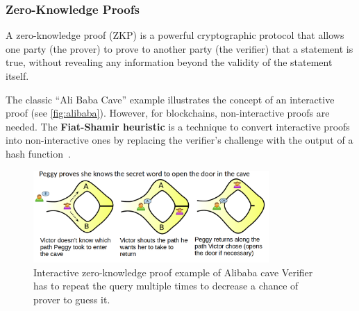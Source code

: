 
\subsubsection{Zero-Knowledge Proofs}\label{zero-knowledge-proofs}

A zero-knowledge proof (ZKP) is a powerful cryptographic protocol that
allows one party (the prover) to prove to another party (the verifier)
that a statement is true, without revealing any information beyond the
validity of the statement itself.


The classic ``Ali Baba Cave'' example illustrates the concept of an
interactive proof (see \autoref{fig:alibaba}). However, for blockchains, non-interactive proofs are
needed. The \textbf{Fiat-Shamir heuristic} is a technique to convert
interactive proofs into non-interactive ones by replacing the verifier's
challenge with the output of a hash function~\cite{fiat1986prove}.


\begin{figure}[t]
	\begin{center}
		\includegraphics[width=0.8\textwidth]{./figs/alibaba.png}
		\caption{Interactive zero-knowledge proof example of Alibaba cave Verifier has to repeat the query multiple times to decrease a chance of prover to guess it.}		
		\label{fig:alibaba}
	\end{center}	
\end{figure}


